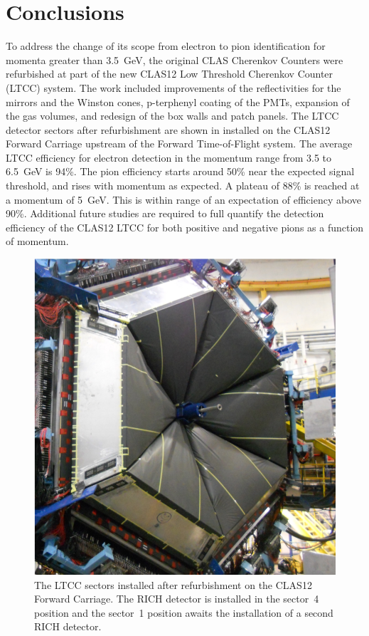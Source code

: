 \section{Conclusions}

To address the change of its scope from electron to pion identification for momenta greater than 3.5~GeV,
the original CLAS Cherenkov Counters were refurbished at part of the new CLAS12 Low Threshold Cherenkov
Counter (LTCC) system. The work included improvements of the reflectivities for the mirrors and the Winston
cones, p-terphenyl coating of the PMTs, expansion of the gas volumes, and redesign of the box walls and patch
panels. The LTCC detector sectors after refurbishment are shown in  installed on the CLAS12
Forward Carriage upstream of the Forward Time-of-Flight system. The average LTCC efficiency for electron
detection in the momentum range from 3.5 to 6.5~GeV is 94\%. The pion efficiency starts around 50\% near
the expected signal threshold, and rises with momentum as expected. A plateau of 88\% is reached at a momentum
of 5~GeV. This is within range of an expectation of efficiency above 90\%. Additional future studies are required
to full quantify the detection efficiency of the CLAS12 LTCC for both positive and negative pions as a function of
momentum.

\begin{figure}
    \centering
    \includegraphics[width=1.0\columnwidth,keepaspectratio]{img/ltccInstalled.png}
    \caption{The LTCC sectors installed after refurbishment on the CLAS12 Forward Carriage. The RICH detector
    is installed in the sector~4 position and the sector~1 position awaits the installation of a second RICH detector.}
    \label{fig:ltccInstalled}
\end{figure}

